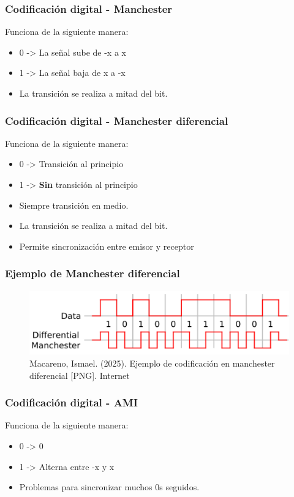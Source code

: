 \documentclass[11pt]{article}
\begin{document}
\subsubsection{Codificación digital - Manchester}
\label{sec:org2145307}
Funciona de la siguiente manera:
\begin{itemize}
\item 0 -> La señal sube de -x a x
\item 1 -> La señal baja de x a -x
\item La transición se realiza a mitad del bit.
\end{itemize}
\subsubsection{Codificación digital - Manchester diferencial}
\label{sec:org32d5829}
Funciona de la siguiente manera:
\begin{itemize}
\item 0 -> Transición al principio
\item 1 -> \textbf{Sin} transición al principio
\item Siempre transición en medio.
\item La transición se realiza a mitad del bit.
\item Permite sincronización entre emisor y receptor
\end{itemize}
\subsubsection{Ejemplo de Manchester diferencial}
\label{sec:org9dc599a}
\begin{figure}[htbp]
\centering
\includegraphics[width=.9\linewidth]{../apuntes/img/ejemplo-codificacion-manchester-diferencial.png}
\caption{Macareno, Ismael. (2025). Ejemplo de codificación en manchester diferencial [PNG]. Internet}
\end{figure}
\subsubsection{Codificación digital - AMI}
\label{sec:orga9a45c4}
Funciona de la siguiente manera:
\begin{itemize}
\item 0 -> 0
\item 1 -> Alterna entre -x y x
\item Problemas para sincronizar muchos 0s seguidos.
\end{itemize}
\end{document}
